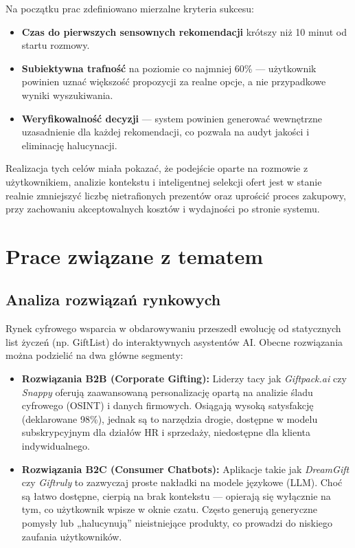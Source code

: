 \documentclass[polish,edition=2025]{zpiday}
\begin{document}
Na początku prac zdefiniowano mierzalne kryteria sukcesu:

\begin{itemize}
    \item \textbf{Czas do pierwszych sensownych rekomendacji} krótszy niż 10 minut od startu rozmowy.
    \item \textbf{Subiektywna trafność} na poziomie co najmniej 60\% — użytkownik powinien uznać większość propozycji za realne opcje, a nie przypadkowe wyniki wyszukiwania.
    \item \textbf{Weryfikowalność decyzji} — system powinien generować wewnętrzne uzasadnienie dla każdej rekomendacji, co pozwala na audyt jakości i eliminację halucynacji.
\end{itemize}

Realizacja tych celów miała pokazać, że podejście oparte na rozmowie z użytkownikiem, analizie kontekstu i inteligentnej selekcji ofert jest w stanie realnie zmniejszyć liczbę nietrafionych prezentów oraz uprościć proces zakupowy, przy zachowaniu akceptowalnych kosztów i wydajności po stronie systemu.

\section{Prace związane z tematem}

\subsection{Analiza rozwiązań rynkowych}

Rynek cyfrowego wsparcia w obdarowywaniu przeszedł ewolucję od statycznych list życzeń (np. GiftList) do interaktywnych asystentów AI. Obecne rozwiązania można podzielić na dwa główne segmenty:

\begin{itemize}
    \item \textbf{Rozwiązania B2B (Corporate Gifting):} Liderzy tacy jak \textit{Giftpack.ai} czy \textit{Snappy} oferują zaawansowaną personalizację opartą na analizie śladu cyfrowego (OSINT) i danych firmowych. Osiągają wysoką satysfakcję (deklarowane 98\%), jednak są to narzędzia drogie, dostępne w modelu subskrypcyjnym dla działów HR i sprzedaży, niedostępne dla klienta indywidualnego.
    \item \textbf{Rozwiązania B2C (Consumer Chatbots):} Aplikacje takie jak \textit{DreamGift} czy \textit{Giftruly} to zazwyczaj proste nakładki na modele językowe (LLM). Choć są łatwo dostępne, cierpią na brak kontekstu — opierają się wyłącznie na tym, co użytkownik wpisze w oknie czatu. Często generują generyczne pomysły lub „halucynują” nieistniejące produkty, co prowadzi do niskiego zaufania użytkowników.
\end{itemize}
\end{document}
